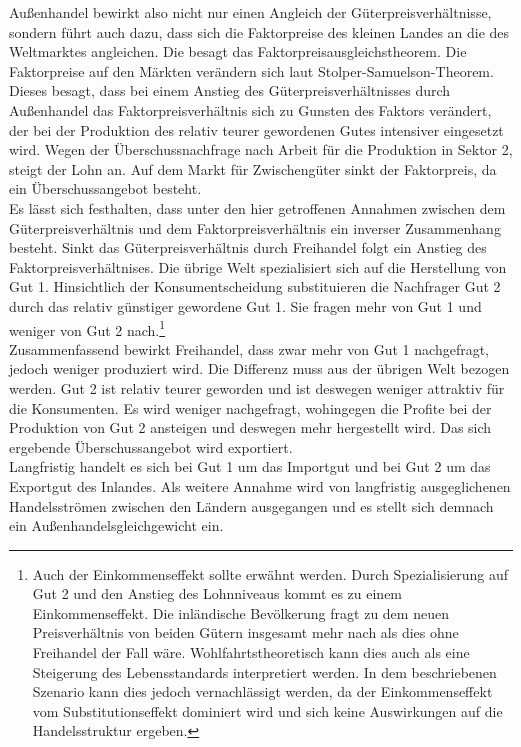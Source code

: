 %
Außenhandel bewirkt also nicht nur einen Angleich der Güterpreisverhältnisse, sondern führt auch dazu, dass sich die Faktorpreise des kleinen Landes an die des Weltmarktes angleichen. Die besagt das Faktorpreisausgleichstheorem. Die Faktorpreise auf den Märkten verändern sich laut Stolper-Samuelson-Theorem. Dieses besagt, dass bei einem Anstieg des Güterpreisverhältnisses durch Außenhandel das Faktorpreisverhältnis sich zu Gunsten des Faktors verändert, der bei der Produktion des relativ teurer gewordenen Gutes intensiver eingesetzt wird. Wegen der Überschussnachfrage nach Arbeit für die Produktion in Sektor 2, steigt der Lohn an. Auf dem Markt für Zwischengüter sinkt der Faktorpreis, da ein Überschussangebot besteht.\\
%
Es lässt sich festhalten, dass unter den hier getroffenen Annahmen zwischen dem Güterpreisverhältnis und dem Faktorpreisverhältnis ein inverser Zusammenhang besteht. Sinkt das Güterpreisverhältnis durch Freihandel folgt ein Anstieg des Faktorpreisverhältnises. Die übrige Welt spezialisiert sich auf die Herstellung von Gut 1. Hinsichtlich der Konsumentscheidung substituieren die Nachfrager Gut 2 durch das relativ günstiger gewordene Gut 1. Sie fragen mehr von Gut 1 und weniger von Gut 2 nach.\footnote{Auch der Einkommenseffekt sollte erwähnt werden. Durch Spezialisierung auf Gut 2 und den Anstieg des Lohnniveaus kommt es zu einem Einkommenseffekt. Die inländische Bevölkerung fragt zu dem neuen Preisverhältnis von beiden Gütern insgesamt mehr nach als dies ohne Freihandel der Fall wäre. Wohlfahrtstheoretisch kann dies auch als eine Steigerung des Lebensstandards interpretiert werden. In dem beschriebenen Szenario kann dies jedoch vernachlässigt werden, da der Einkommenseffekt vom Substitutionseffekt dominiert wird und sich keine Auswirkungen auf die Handelsstruktur ergeben.} \\
%
Zusammenfassend bewirkt Freihandel, dass zwar mehr von Gut 1 nachgefragt, jedoch weniger produziert wird. Die Differenz muss aus der übrigen Welt bezogen werden. Gut 2 ist relativ teurer geworden und ist deswegen weniger attraktiv für die Konsumenten. Es wird weniger nachgefragt, wohingegen die Profite bei der Produktion von Gut 2 ansteigen und deswegen mehr hergestellt wird. Das sich ergebende Überschussangebot wird exportiert.\\
Langfristig handelt es sich bei Gut 1 um das Importgut und bei Gut 2 um das Exportgut des Inlandes. Als weitere Annahme wird von langfristig ausgeglichenen Handelsströmen zwischen den Ländern ausgegangen und es stellt sich demnach ein Außenhandelsgleichgewicht ein. 
%
